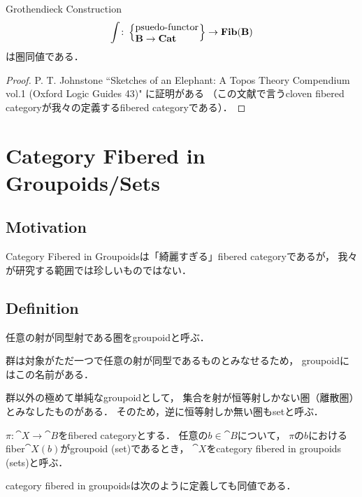 \documentclass[a4paper, dvipdfmx]{jsarticle}
\newcommand{\Fib}[1]{\cat{Fib}(\cat{#1})}
\begin{document}
    \begin{Thm}
        Grothendieck Construction
        \[
            \int \colon
            \left\{ \parbox{2.3cm}{psuedo-functor \\ \quad \ $\cat{B} \to \Cat$} \right\} \to \Fib{B}
        \]
        は圏同値である．
    \end{Thm}
    \begin{proof}
        P. T. Johnstone
            ``Sketches of an Elephant: A Topos Theory Compendium vol.1 (Oxford Logic Guides 43)"
        に証明がある
        （この文献で言うcloven fibered categoryが我々の定義するfibered categoryである）．
    \end{proof}

\section{Category Fibered in Groupoids/Sets}
\subsection{Motivation}
    Category Fibered in Groupoidsは「綺麗すぎる」fibered categoryであるが，
    我々が研究する範囲では珍しいものではない．
    

\subsection{Definition}
    \begin{Def}[Groupoid]
        任意の射が同型射である圏をgroupoidと呼ぶ．
    \end{Def}

    \begin{Remark}
        群は対象がただ一つで任意の射が同型であるものとみなせるため，
        groupoidにはこの名前がある．

        群以外の極めて単純なgroupoidとして，
        集合を射が恒等射しかない圏（離散圏）とみなしたものがある．
        そのため，逆に恒等射しか無い圏もsetと呼ぶ．
    \end{Remark}

    \begin{Def}
        $\pi \colon \cat{X} \to \cat{B}$をfibered categoryとする．
        任意の$b \in \cat{B}$について，
        $\pi$の$b$におけるfiber$\cat{X}(b)$がgroupoid (set)であるとき，
        $\cat{X}$をcategory fibered in groupoids (sets)と呼ぶ．
    \end{Def}
    category fibered in groupoidsは次のように定義しても同値である．
\end{document}
